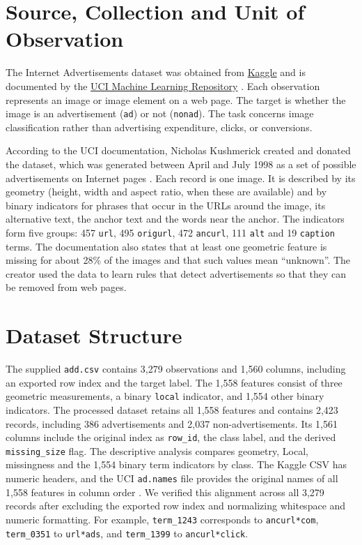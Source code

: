 \section{Source, Collection and Unit of Observation}

The Internet Advertisements dataset was obtained from
\href{https://www.kaggle.com/datasets/uciml/internet-advertisements-data-set/data}{Kaggle}
and is documented by the
\href{https://archive.ics.uci.edu/dataset/51/internet+advertisements}{UCI Machine Learning Repository} \citep{kushmerick1999}.
Each observation represents an image or image element on a web page.
The target is whether the image is an advertisement (\texttt{ad}) or
not (\texttt{nonad}). The task concerns image classification rather
than advertising expenditure, clicks, or conversions.

According to the UCI documentation, Nicholas Kushmerick created and donated
the dataset, which was generated between April and July 1998 as a set of
possible advertisements on Internet pages \citep{kushmerick1999}. Each record
is one image. It is described by its geometry (height, width and aspect
ratio, when these are available) and by binary indicators for phrases that
occur in the URLs around the image, its alternative text, the anchor text and
the words near the anchor. The indicators form five groups: 457
\texttt{url}, 495 \texttt{origurl}, 472 \texttt{ancurl}, 111 \texttt{alt}
and 19 \texttt{caption} terms. The documentation also states that at least
one geometric feature is missing for about 28\% of the images and that such
values mean ``unknown''. The creator used the data to learn rules that detect
advertisements so that they can be removed from web pages.

\section{Dataset Structure}

The supplied \texttt{add.csv} contains 3,279 observations and 1,560
columns, including an exported row index and the target label.
The 1,558 features consist of three geometric measurements, a binary
\texttt{local} indicator, and 1,554 other binary indicators.
The processed dataset retains all 1,558 features and contains 2,423 records,
including 386 advertisements and 2,037 non-advertisements.
Its 1,561 columns include the original index as \texttt{row\_id},
the class label, and the derived \texttt{missing\_size} flag.
The descriptive analysis compares geometry, Local, missingness and the
1,554 binary term indicators by class. The Kaggle CSV has numeric headers,
and the UCI \texttt{ad.names} file provides the original names of all 1,558
features in column order \citep{kushmerick1999}. We verified this alignment
across all 3,279 records after excluding the exported row index and
normalizing whitespace and numeric formatting. For example,
\texttt{term\_1243} corresponds to \texttt{ancurl*com},
\texttt{term\_0351} to \texttt{url*ads}, and
\texttt{term\_1399} to \texttt{ancurl*click}.

